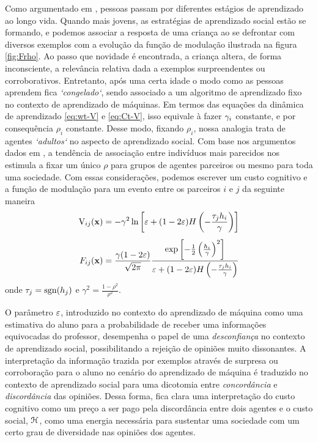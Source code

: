 Como argumentado em \parencite{Cesar2014}, pessoas passam por diferentes estágios de aprendizado ao longo vida.
Quando mais  jovens, as estratégias de aprendizado social estão se formando, e podemos associar a resposta de uma criança ao se defrontar com diversos exemplos com a evolução da função de modulação ilustrada na figura \ref{fig:Frho}.
Ao passo que novidade é encontrada, a criança altera, de forma inconsciente, a relevância relativa dada a exemplos surpreendentes ou corroborativos.
Entretanto, após uma certa idade o modo como as pessoas aprendem fica \emph{`congelado`}, sendo associado a um algoritmo de aprendizado fixo no contexto de aprendizado de máquinas.
Em termos das equações da dinâmica de aprendizado \eqref{eq:wt-V} e \eqref{eq:Ct-V}, isso equivale à fazer $\gamma_i$ constante, e por consequência $\rho_i$ constante. Desse modo, fixando $\rho_i$, nossa analogia trata de agentes \emph{`adultos`} no aspecto de aprendizado social.
Com base nos argumentos dados em \parencite{Caticha2011}, a tendência de associação entre indivíduos mais parecidos nos estimula a fixar um único $\rho$ para grupos de agentes parceiros ou mesmo para toda uma sociedade.
\newcommand{\Vab}[2]{\ensuremath{\cogcost_{#1#2}}}
\newcommand{\gm}{\ensuremath{\gamma}}
\newcommand{\stb}{\ensuremath{\frac{\tau_j h_i}{\gm}}}
Com essas considerações, podemos escrever um custo cognitivo e a função de modulação para um evento entre os parceiros $i$ e $j$ da seguinte maneira
\begin{align}
    \Vab{i}{j}(\vec{x}) & = -\gm^2\ln\inbk{\ns
      + (1-2\ns)H\inpr{-\stb}} \label{eq:Vij}  \\[4pt]
    F_{ij}(\vec{x}) & = \frac{\gm(1 - 2\ns)}{\sqrt{2\pi}}
    \frac{\exp\inbk{-\half\inpr{\frac{h_i}{\gm}}^2}}{\ns
      + (1-2\ns)H\inpr{-\stb}} \label{eq:Fij}
\end{align}
onde $\tau_j = \mathrm{sgn}(h_j)$ e $\gm^2 = \frac{1-\rho^2}{\rho^2}$.

O parâmetro $\varepsilon$, introduzido no contexto do aprendizado de máquina como uma estimativa do aluno para a probabilidade de receber uma informações equivocadas do professor, desempenha o papel de uma \emph{desconfiança} no contexto de aprendizado social, possibilitando a rejeição de opiniões muito dissonantes.
A interpretação da informação trazida por exemplos através de surpresa ou corroboração para o aluno no cenário do aprendizado de máquina é traduzido no contexto de aprendizado social para uma dicotomia entre \emph{concordância} e \emph{discordância} das opiniões.
Dessa forma, fica clara uma interpretação do custo cognitivo como um preço a ser pago pela discordância entre dois agentes e o custo social, ${\mathcal{H}}$, como uma energia necessária para sustentar uma sociedade com um certo grau de diversidade nas opiniões dos agentes.

